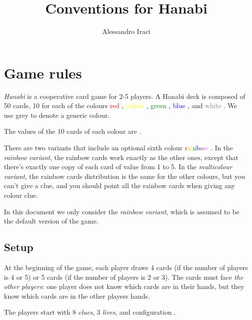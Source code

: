 \documentclass[a4paper]{article}
\title{Conventions for Hanabi}
\author{Alessandro Iraci}
\theoremstyle{plain}
\theoremstyle{definition}
\newtheorem{definition}[theorem]{Definition}
\begin{document}
	
\maketitle

\section{Game rules}

\textit{Hanabi} is a cooperative card game for 2-5 players. A Hanabi deck is composed of 50 cards, 10 for each of the colours \textcolor{red}{red} \red, \textcolor{yellow}{yellow} \yellow, \textcolor{green}{green} \green, \textcolor{blue}{blue} \blue, and \textcolor{gray}{white} \white. We use grey to denote a generic colour.

The values of the 10 cards of each colour are          .

There are two variants that include an optional sixth colour \textcolor{red}{r}\textcolor{orange}{a}\textcolor{yellow}{i}\textcolor{green}{n}\textcolor{blue}{b}\textcolor{purple}{o}\textcolor{violet}{w} \rainbow. In the \textit{rainbow variant}, the rainbow cards work exactly as the other ones, except that there's exactly one copy of each card of value from 1 to 5. In the \textit{multicolour variant}, the rainbow cards distribution is the same for the other colours, but you can't give a  clue, and you should point all the rainbow cards when giving any colour clue.

In this document we only consider the \textit{rainbow variant}, which is assumed to be the default version of the game.


\subsection{Setup}

At the beginning of the game, each player draws 4 cards (if the number of players is 4 or 5) or 5 cards (if the number of players is 2 or 3). The cards must face \textit{the other players}: one player does not know which cards are in their hands, but they know which cards are in the other players hands.

The players start with 8 \textit{clues}, 3 \textit{lives}, and configuration      .
\end{document}
